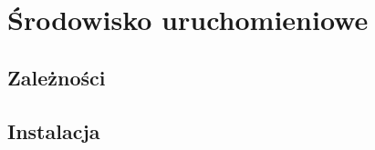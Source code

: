 \chapter{Środowisko uruchomieniowe}\label{Chapter_EnvironmentAppendix}
  \section{Zależności}\label{Section_Dependencies}
  \section{Instalacja}\label{Section_Installation}